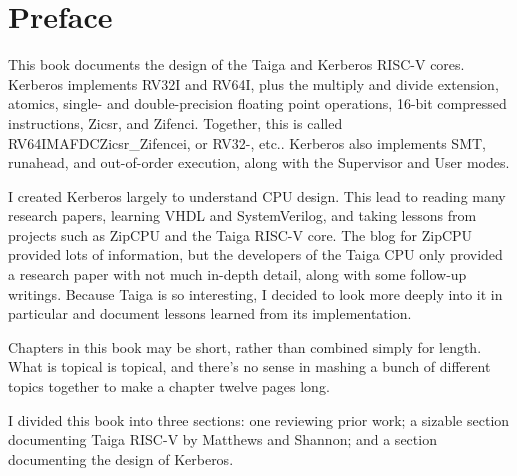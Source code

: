 \chapter*{Preface}
This book documents the design of the Taiga and Kerberos RISC-V cores.  Kerberos implements RV32I and RV64I, plus the multiply and divide extension, atomics, single- and double-precision floating point operations, 16-bit compressed instructions, Zicsr, and Zifenci.  Together, this is called RV64IMAFDCZicsr\_Zifencei, or RV32-, etc..  Kerberos also implements SMT, runahead, and out-of-order execution, along with the Supervisor and User modes.

I created Kerberos largely to understand CPU design.  This lead to reading many research papers, learning VHDL and SystemVerilog, and taking lessons from projects such as ZipCPU and the Taiga RISC-V core.  The blog for ZipCPU provided lots of information, but the developers of the Taiga CPU only provided a research paper with not much in-depth detail, along with some follow-up writings.  Because Taiga is so interesting, I decided to look more deeply into it in particular and document lessons learned from its implementation.

Chapters in this book may be short, rather than combined simply for length.  What is topical is topical, and there's no sense in mashing a bunch of different topics together to make a chapter twelve pages long.

I divided this book into three sections:  one reviewing prior work; a sizable section documenting Taiga RISC-V by Matthews and Shannon; and a section documenting the design of Kerberos.